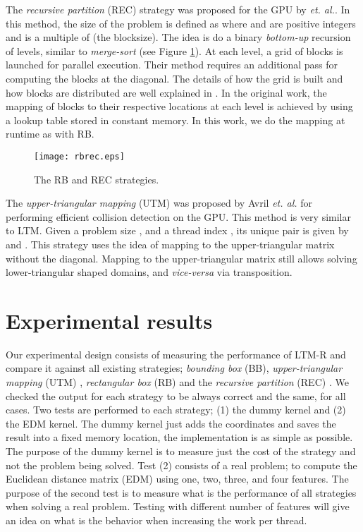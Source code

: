 \documentclass[conference]{IEEEtran}
\begin{document}
The \textit{recursive partition} (REC) strategy was proposed for the GPU by \cite{Ries:2009:TMI:1654059.1654069} \textit{et. al.}. In this method, the size of the problem is defined 
as  where  and  are positive integers and  is a multiple of  (the blocksize). The idea is do a binary \textit{bottom-up} recursion of  levels, similar to \textit{merge-sort} (see Figure \ref{fig_other_methods}). 
At each level, a grid of blocks is launched for parallel execution. Their method requires an additional pass for computing the blocks at the diagonal. The details of how the grid is built and how blocks are distributed are well explained in 
\cite{Ries:2009:TMI:1654059.1654069}. 
In the original work, the mapping of blocks to their respective locations at each level is achieved by using a lookup table stored in constant memory. 
In this work, we do the mapping at runtime as with RB. 
\begin{figure}[ht!]
\centering
\texttt{[image: rbrec.eps]}
\caption{The RB and REC strategies.}
\label{fig_other_methods}
\end{figure}

The \textit{upper-triangular mapping} (UTM) was proposed by Avril \textit{et. al.} \cite{AvrilGA12} for performing efficient collision detection on the GPU. 
This method is very similar to LTM. Given a problem size , 
and a thread index , its unique pair  is given by  and . This strategy uses the idea 
of mapping to the upper-triangular matrix without the diagonal. Mapping to the upper-triangular matrix still allows solving lower-triangular shaped domains, and \textit{vice-versa} via transposition.















\section{Experimental results}
\label{sec_experimental_results}
Our experimental design consists of measuring the performance of LTM-R and compare it against all existing strategies; 
\textit{bounding box} (BB), \textit{upper-triangular mapping} (UTM) \cite{AvrilGA12}, \textit{rectangular box} (RB) \cite{Jung2008} and 
the \textit{recursive partition} (REC) \cite{Ries:2009:TMI:1654059.1654069}. We checked the output for each strategy to be always correct and the same, for all cases.
Two tests are performed to each strategy; (1) the dummy kernel and (2) the EDM kernel. The dummy kernel just adds the coordinates 
and saves the result into a fixed memory location, the implementation is as simple as possible. 
The purpose of the dummy kernel is to measure just the cost of the strategy and not the problem being solved. 
Test (2) consists of a real problem; to compute the Euclidean distance matrix (EDM) using one, two, three, and four features. The purpose 
of the second test is to measure what is the performance of all strategies when solving a real problem. Testing with different number of 
features will give an idea on what is the behavior when increasing the work per thread.
\end{document}
